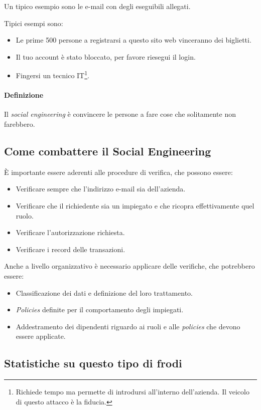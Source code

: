 Un tipico esempio sono le e-mail con degli eseguibili allegati.

Tipici esempi sono:
\begin{itemize}
  \item Le prime 500 persone a registrarsi a questo sito web vinceranno dei
  biglietti.
  \item Il tuo account è stato bloccato, per favore riesegui il login.
  \item Fingersi un tecnico IT\footnote{Richiede tempo ma permette di
introdursi all'interno dell'azienda. Il veicolo
di questo attacco è la fiducia.}.
\end{itemize}

\paragraph*{Definizione} Il \textit{social engineering} è convincere le persone
a fare cose che solitamente non farebbero.

\subsection{Come combattere il Social Engineering}

È importante essere aderenti alle procedure di verifica, che possono essere:
\begin{itemize}
  \item Verificare sempre che l'indirizzo e-mail sia dell'azienda.
  \item Verificare che il richiedente sia un impiegato e che ricopra
  effettivamente quel ruolo.
  \item Verificare l'autorizzazione richiesta.
  \item Verificare i record delle transazioni.
\end{itemize}

Anche a livello organizzativo è necessario applicare delle verifiche, che
potrebbero essere:
\begin{itemize}
  \item Classificazione dei dati e definizione del loro trattamento.
  \item \textit{Policies} definite per il comportamento degli impiegati.
  \item Addestramento dei dipendenti riguardo ai ruoli e alle \textit{policies}
che devono essere applicate.
\end{itemize}

\subsection{Statistiche su questo tipo di frodi}


